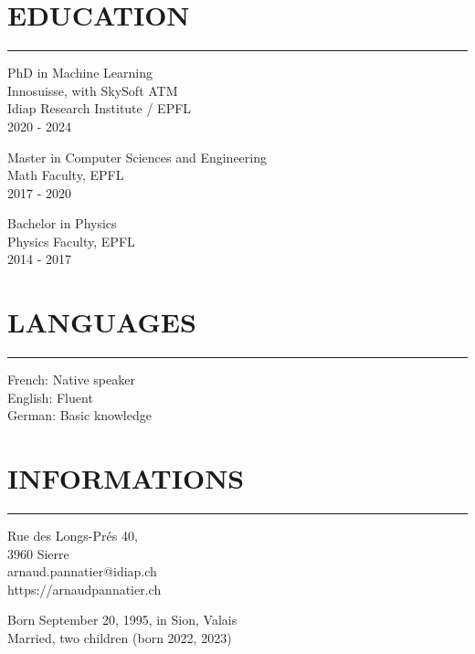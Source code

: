 \documentclass{article}
\let\oldhrule\hrule
\renewcommand{\hrule}{\color{LightGray}\oldhrule\color{black}}
\newcommand{\rubric}[1]{
    \color{MediumGray}

    \section*{\montserratlight \large \MakeUppercase{#1}} 
    \hrule
    \vspace{4mm}
    \raggedright
}
\begin{document}
\begin{minipage}[t][0.78\textheight][t]{0.3\textwidth}
  \rubric{Education}

  \color{DeepGray}
  \large PhD in Machine Learning \\
  \color{MediumGray} \small
  Innosuisse, with SkySoft ATM \\
  Idiap Research Institute / EPFL \\
  2020 - 2024

  \vspace{4mm}
  \color{DeepGray}
  \large Master in Computer Sciences and Engineering \\
  \color{MediumGray} \small
  Math Faculty, EPFL \\
  2017 - 2020

  \vspace{4mm}
  \color{DeepGray}
  \large Bachelor in Physics \\
  \color{MediumGray} \small
  Physics Faculty, EPFL \\
  2014 - 2017

  \rubric{Languages}
  French: Native speaker \\
  English: Fluent \\
  German: Basic knowledge

  \vfill
  \rubric{Informations}
  Rue des Longs-Prés 40, \\
  3960 Sierre \\

  arnaud.pannatier@idiap.ch \\
  https://arnaudpannatier.ch \\

  \vspace{4mm}

  Born September 20, 1995, in Sion, Valais \\
  Married, two children (born 2022, 2023)

\end{minipage}\hfill
\end{document}
